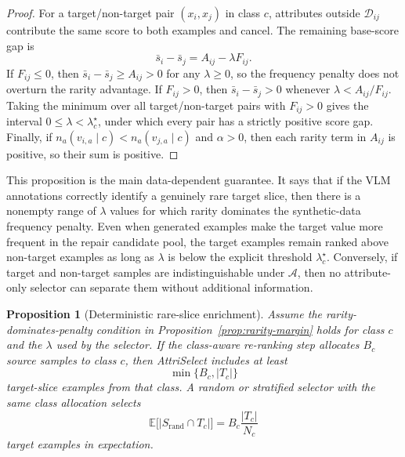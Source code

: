 \documentclass{article}
\newcommand{\model}{AttriSelect\xspace}
\newcommand{\attrs}{\mathcal{A}}
\newtheorem{proposition}{Proposition}
\begin{document}
\begin{proof}
For a target/non-target pair $(x_i,x_j)$ in class $c$, attributes outside $\mathcal{D}_{ij}$ contribute the same score to both examples and cancel. The remaining base-score gap is
\begin{equation}
\label{eq:base-score-gap}
\bar{s}_i-\bar{s}_j
=
A_{ij}-\lambda F_{ij}.
\end{equation}
If $F_{ij}\leq 0$, then $\bar{s}_i-\bar{s}_j\geq A_{ij}>0$ for any $\lambda\geq 0$, so the frequency penalty does not overturn the rarity advantage. If $F_{ij}>0$, then $\bar{s}_i-\bar{s}_j>0$ whenever $\lambda<A_{ij}/F_{ij}$. Taking the minimum over all target/non-target pairs with $F_{ij}>0$ gives the interval $0\leq\lambda<\lambda_c^\star$, under which every pair has a strictly positive score gap. Finally, if $n_a(v_{i,a}\mid c)<n_a(v_{j,a}\mid c)$ and $\alpha>0$, then each rarity term in $A_{ij}$ is positive, so their sum is positive.
\end{proof}

This proposition is the main data-dependent guarantee. It says that if the VLM annotations correctly identify a genuinely rare target slice, then there is a nonempty range of $\lambda$ values for which rarity dominates the synthetic-data frequency penalty. Even when generated examples make the target value more frequent in the repair candidate pool, the target examples remain ranked above non-target examples as long as $\lambda$ is below the explicit threshold $\lambda_c^\star$. Conversely, if target and non-target samples are indistinguishable under $\attrs$, then no attribute-only selector can separate them without additional information.

\begin{proposition}[Deterministic rare-slice enrichment]
\label{prop:deterministic-enrichment}
Assume the rarity-dominates-penalty condition in Proposition~\ref{prop:rarity-margin} holds for class $c$ and the $\lambda$ used by the selector. If the class-aware re-ranking step allocates $B_c$ source samples to class $c$, then \model includes at least
\begin{equation}
\label{eq:deterministic-enrichment-bound}
\min\{B_c,|T_c|\}
\end{equation}
target-slice examples from that class. A random or stratified selector with the same class allocation selects
\begin{equation}
\label{eq:random-target-expectation}
\mathbb{E}\big[|S_{\mathrm{rand}}\cap T_c|\big]
=
B_c\frac{|T_c|}{N_c}
\end{equation}
target examples in expectation.
\end{proposition}
\end{document}
